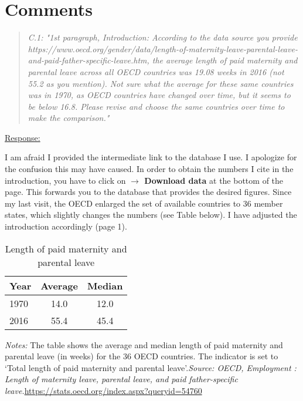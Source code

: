 
\clearpage
\section{Comments}


{}
\begin{quote}
\textit{C.1: "1st paragraph, Introduction: According to the data source you provide https://www.oecd.org/gender/data/length-of-maternity-leave-parental-leave-and-paid-father-specific-leave.htm, the average length of paid maternity and parental leave across all OECD countries was 19.08 weeks in 2016 (not 55.2 as you mention). Not sure what the average for these same countries was in 1970, as OECD countries have changed over time, but it seems to be below 16.8. Please revise and choose the same countries over time to make the comparison."}
\end{quote}

\underline{Response:} 

I am afraid I provided the intermediate link to the database I use. I apologize for the confusion this may have caused. In order to obtain the numbers I cite in the introduction, you have to click on \textbf{$\rightarrow$ Download data} at the bottom of the page. This forwards you to the database that provides the desired figures. Since my last visit, the OECD enlarged the set of available countries to 36 member states, which slightly changes the numbers (see Table below). I have adjusted the introduction accordingly (page 1).
 
\begin{table}[H] \centering 
	\begin{threeparttable} \centering \caption{Length of paid maternity and parental leave}\label{rev_mlch: }
		\begin{tabular*}{.7\linewidth}{@{\extracolsep{\fill}}l*{2}{c}}
			\toprule
			Year & Average & Median \\
			\midrule
			1970	&	14.0	&	12.0 \\
			2016	&	55.4	&	45.4 \\
			\bottomrule
		\end{tabular*}
		\begin{tablenotes} 
			\item \scriptsize \emph{Notes:} The table shows the average and median length of paid maternity and parental leave (in weeks) for the 36 OECD countries. The indicator is set to `Total length of paid maternity and parental leave'.\newline \emph{Source: OECD, Employment  : Length of maternity leave, parental leave, and paid father-specific leave.}\newline \url{https://stats.oecd.org/index.aspx?queryid=54760}
		\end{tablenotes}
	\end{threeparttable}
\end{table} 
 
